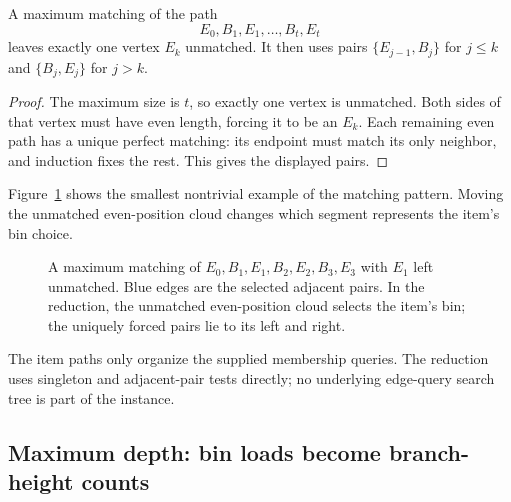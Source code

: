 \begin{lemma}\label{lem:odd-path}
A maximum matching of the path
\[
 E_0,B_1,E_1,\ldots,B_t,E_t
\]
leaves exactly one vertex $E_k$ unmatched. It then uses pairs
$\{E_{j-1},B_j\}$ for $j\le k$ and
$\{B_j,E_j\}$ for $j>k$.
\end{lemma}
\begin{proof}
The maximum size is $t$, so exactly one vertex is unmatched.
Both sides of that vertex must have even length, forcing it
to be an $E_k$. Each remaining even path has a unique perfect
matching: its endpoint must match its only neighbor, and induction
fixes the rest. This gives the displayed pairs.
\end{proof}

Figure~\ref{fig:odd-path-matching} shows the smallest nontrivial
example of the matching pattern. Moving the unmatched even-position
cloud changes which segment represents the item's bin choice.
\begin{figure}[tbp]
\centering
{}
\caption{A maximum matching of
$E_0,B_1,E_1,B_2,E_2,B_3,E_3$ with $E_1$ left unmatched.
Blue edges are the selected adjacent pairs. In the reduction, the
unmatched even-position cloud selects the item's bin; the uniquely
forced pairs lie to its left and right.}
\label{fig:odd-path-matching}
\end{figure}

The item paths only organize the supplied membership queries. The
reduction uses singleton and adjacent-pair tests directly; no
underlying edge-query search tree is part of the instance.

\subsection{Maximum depth: bin loads become branch-height counts}

